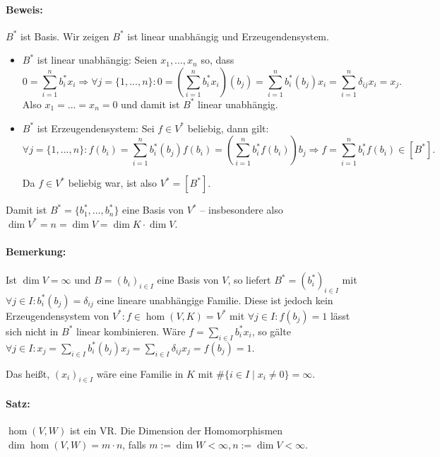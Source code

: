 \paragraph{Beweis:} $B^*$ ist Basis. Wir zeigen $B^*$ ist linear unabhängig und Erzeugendensystem.
	\begin{itemize}
            \item $ B^* $ ist linear unabhängig: Seien $ x_1,...,x_n $ so, dass
                    \begin{equation*}
                    0 = \sum_{i=1}^{n}b_i^*x_i \Rightarrow \forall j=\{1,...,n\}:0=(\sum_{i=1}^{n}b_i^*x_i)(b_j) = \sum_{i=1}^{n}b_i^*(b_j)x_i = \sum_{i=1}^{n}\delta_{ij}x_i = x_j.
                    \end{equation*}
            Also $ x_1 = ... = x_n = 0 $ und damit ist $ B^* $ linear unabhängig.
            \item $ B^* $ ist Erzeugendensystem: Sei $ f\in V^* $ beliebig, dann gilt:
            \begin{equation*}
                    \forall j = \{1,...,n\}:f(b_i) = \sum_{i=1}^{n}b_i^*(b_j)f(b_i) = (\sum_{i=1}^{n}b_i^*f(b_i))b_j \Rightarrow f = \sum_{i=1}^{n}b_i^*f(b_i)\in [B^*].
            \end{equation*}
            
            Da $ f\in V^* $ beliebig war, ist also $ V^* = [B^*]$.
	\end{itemize}
	
	Damit ist $ B^* = \{b_1^*,...,b_n^*\}$ eine Basis von $ V^* $ -- insbesondere also $ \dim V^* = n = \dim V = \dim K\cdot \dim V $.

\paragraph{Bemerkung:}
	Ist $\dim V = \infty$ und $B=(b_i)_{i\in I}$ eine Basis von $V$, so liefert $B^\ast=(b_i^\ast)_{i\in I}$ mit $\forall j\in I:b_i^\ast(b_j)=\delta_{ij}$ eine lineare unabhängige Familie. Diese ist jedoch kein Erzeugendensystem von $V^\ast: f\in\hom(V,K)=V^\ast$ mit $\forall j\in I:f(b_j)=1$ lässt sich nicht in $B^\ast$ linear kombinieren. Wäre $f=\sum_{i\in I}b_i^\ast x_i$, so gälte $\forall j\in I: x_j =\sum_{i\in I}b_i^\ast(b_j)x_j= \sum_{i\in I} \delta_{ij}x_j = f(b_j) = 1$.

	Das heißt, $(x_i)_{i\in I}$ wäre eine Familie in $ K $ mit $\#\{i\in I\mid x_i\neq 0\}=\infty$.

\paragraph{Satz:}
	$ \hom (V,W) $ ist ein VR. Die Dimension der Homomorphismen $\dim\hom (V,W) = m\cdot n$, falls $m:=\dim W<\infty, n:=\dim V< \infty$.
	
